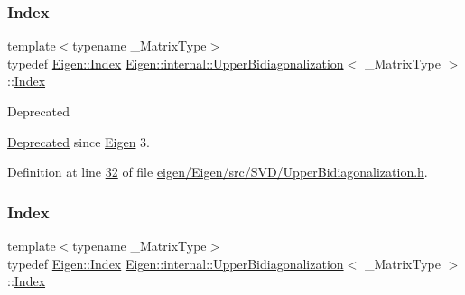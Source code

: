 \subsubsection{\texorpdfstring{Index}{Index}\hspace{0.1cm}{\footnotesize\ttfamily [1/2]}}
{\footnotesize\ttfamily template$<$typename \+\_\+\+Matrix\+Type$>$ \\
typedef \hyperlink{namespace_eigen_a62e77e0933482dafde8fe197d9a2cfde}{Eigen\+::\+Index} \hyperlink{class_eigen_1_1internal_1_1_upper_bidiagonalization}{Eigen\+::internal\+::\+Upper\+Bidiagonalization}$<$ \+\_\+\+Matrix\+Type $>$\+::\hyperlink{class_eigen_1_1internal_1_1_upper_bidiagonalization_adcb14f3919a3dcc9977ba6b8105087fe}{Index}}

\begin{DoxyRefDesc}{Deprecated}
\item[\hyperlink{deprecated__deprecated000039}{Deprecated}]since \hyperlink{namespace_eigen}{Eigen} 3. \end{DoxyRefDesc}


Definition at line \hyperlink{eigen_2_eigen_2src_2_s_v_d_2_upper_bidiagonalization_8h_source_l00032}{32} of file \hyperlink{eigen_2_eigen_2src_2_s_v_d_2_upper_bidiagonalization_8h_source}{eigen/\+Eigen/src/\+S\+V\+D/\+Upper\+Bidiagonalization.\+h}.

\mbox{\label{class_eigen_1_1internal_1_1_upper_bidiagonalization_adcb14f3919a3dcc9977ba6b8105087fe}} 
\subsubsection{\texorpdfstring{Index}{Index}\hspace{0.1cm}{\footnotesize\ttfamily [2/2]}}
{\footnotesize\ttfamily template$<$typename \+\_\+\+Matrix\+Type$>$ \\
typedef \hyperlink{namespace_eigen_a62e77e0933482dafde8fe197d9a2cfde}{Eigen\+::\+Index} \hyperlink{class_eigen_1_1internal_1_1_upper_bidiagonalization}{Eigen\+::internal\+::\+Upper\+Bidiagonalization}$<$ \+\_\+\+Matrix\+Type $>$\+::\hyperlink{class_eigen_1_1internal_1_1_upper_bidiagonalization_adcb14f3919a3dcc9977ba6b8105087fe}{Index}}

